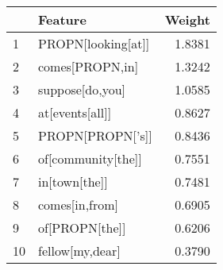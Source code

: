 \begin{tabular}{llr}
\toprule
{} &             Feature &  Weight \\
\midrule
1  &  PROPN[looking[at]] &  1.8381 \\
2  &     comes[PROPN,in] &  1.3242 \\
3  &     suppose[do,you] &  1.0585 \\
4  &     at[events[all]] &  0.8627 \\
5  &    PROPN[PROPN['s]] &  0.8436 \\
6  &  of[community[the]] &  0.7551 \\
7  &       in[town[the]] &  0.7481 \\
8  &      comes[in,from] &  0.6905 \\
9  &      of[PROPN[the]] &  0.6206 \\
10 &     fellow[my,dear] &  0.3790 \\
\bottomrule
\end{tabular}

